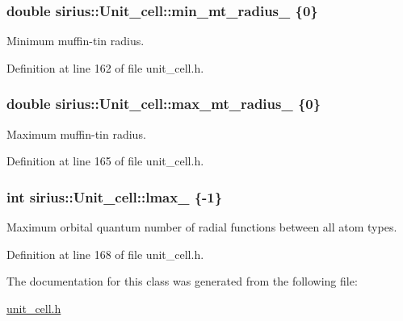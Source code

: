 \subsubsection[{min\+\_\+mt\+\_\+radius\+\_\+}]{\setlength{\rightskip}{0pt plus 5cm}double sirius\+::\+Unit\+\_\+cell\+::min\+\_\+mt\+\_\+radius\+\_\+ \{0\}\hspace{0.3cm}{\ttfamily [private]}}\label{classsirius_1_1_unit__cell_a811f4365eb0377e75c2846c472e122df}


Minimum muffin-\/tin radius. 



Definition at line 162 of file unit\+\_\+cell.\+h.

\hypertarget{classsirius_1_1_unit__cell_a1f7acd5822d56a04d70fc56730e8959a}{}
\subsubsection[{max\+\_\+mt\+\_\+radius\+\_\+}]{\setlength{\rightskip}{0pt plus 5cm}double sirius\+::\+Unit\+\_\+cell\+::max\+\_\+mt\+\_\+radius\+\_\+ \{0\}\hspace{0.3cm}{\ttfamily [private]}}\label{classsirius_1_1_unit__cell_a1f7acd5822d56a04d70fc56730e8959a}


Maximum muffin-\/tin radius. 



Definition at line 165 of file unit\+\_\+cell.\+h.

\hypertarget{classsirius_1_1_unit__cell_a622aa1eeb5b646e665194cbc6d7dc08c}{}
\subsubsection[{lmax\+\_\+}]{\setlength{\rightskip}{0pt plus 5cm}int sirius\+::\+Unit\+\_\+cell\+::lmax\+\_\+ \{-\/1\}\hspace{0.3cm}{\ttfamily [private]}}\label{classsirius_1_1_unit__cell_a622aa1eeb5b646e665194cbc6d7dc08c}


Maximum orbital quantum number of radial functions between all atom types. 



Definition at line 168 of file unit\+\_\+cell.\+h.



The documentation for this class was generated from the following file\+:\begin{DoxyCompactItemize}
\item 
\hyperlink{unit__cell_8h}{unit\+\_\+cell.\+h}\end{DoxyCompactItemize}
